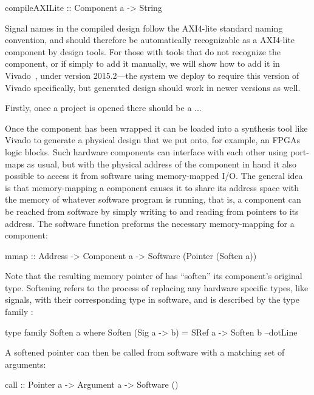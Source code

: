 \documentclass[../paper.tex]{subfiles}
\begin{document}
\begin{code}
compileAXILite :: Component a -> String
\end{code}

Signal names in the compiled design follow the AXI4-lite standard naming convention, and should therefore be automatically recognizable as a AXI4-lite component by design tools. For those with tools that do not recognize the component, or if simply to add it manually, we will show how to add it in Vivado~\cite{feist2012}, under version 2015.2---the system we deploy to require this version of Vivado specifically, but generated design should work in newer versions as well.

Firstly, once a project is opened there should be a ...

Once the component has been wrapped it can be loaded into a synthesis tool like Vivado to generate a physical design that we put onto, for example, an FPGAs logic blocks. Such hardware components can interface with each other using port-maps as usual, but with the physical address of the component in hand it also possible to access it from software using memory-mapped I/O. The general idea is that memory-mapping a component causes it to share its address space with the memory of whatever software program is running, that is, a component can be reached from software by simply writing to and reading from pointers to its address. The software function  preforms the necessary memory-mapping for a component:

\begin{code}
mmap :: Address -> Component a -> Software (Pointer (Soften a))
\end{code}

\noindent Note that the resulting memory pointer of  has ``soften'' its component's original type. Softening refers to the process of replacing any hardware specific types, like signals, with their corresponding type in software, and is described by the type family :

\begin{code}
type family Soften a where
  Soften (Sig a -> b) = SRef a -> Soften b
  --dotLine
\end{code}

A softened pointer can then be called from software with a matching set of arguments:

\begin{code}
call :: Pointer a -> Argument a -> Software ()
\end{code}
\end{document}
